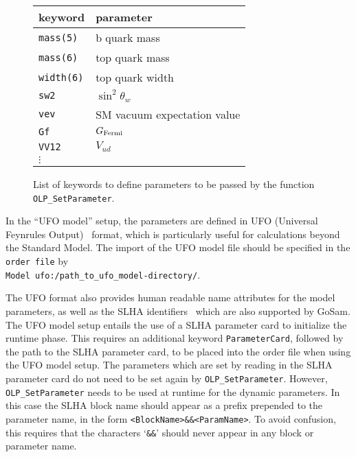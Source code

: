 \begin{figure}[htb]
\begin{tabular}{|l|l|}
\hline
keyword & parameter\\
\hline
{\tt mass(5)} & b quark mass \\
{\tt mass(6)} & top quark mass \\
{\tt width(6)} & top quark width\\
{\tt sw2}& $\sin^2\theta_w$\\
{\tt vev}& SM vacuum expectation value\\
{\tt Gf} & $G_{\rm{Fermi}}$\\
{\tt VV12}& $V_{ud}$\\
$\vdots$ & \\
\hline
\end{tabular}
\caption{List of keywords to define parameters to be passed by the function {\tt
OLP\_SetParameter}.}
\label{tab:keywords:static}
\end{figure}

In the ``UFO model'' setup, the parameters are defined in UFO (Universal Feynrules
Output)~\cite{Degrande:2011ua} format, which is particularly useful for
calculations beyond the Standard Model.
The import of the UFO model file should be specified in the {\tt order file} 
by \\{\tt Model ufo:/path\_to\_ufo\_model-directory/}.

The UFO format also provides human readable name attributes for the 
model parameters, as well as the 
SLHA identifiers~\cite{Skands:2003cj} which are also supported by GoSam.
The UFO model setup entails the use of a SLHA parameter card to initialize the runtime phase.
This requires an additional keyword {\tt ParameterCard}, followed by the path to the SLHA parameter card,
to be placed into the order file when using the UFO model setup. 
The parameters which are set by reading in the SLHA parameter card do not need to be set 
again by {\tt OLP\_SetParameter}. However, {\tt OLP\_SetParameter} needs to be used at 
runtime for the dynamic parameters. 
In this case the SLHA block name should appear as a prefix prepended to the parameter name, 
in the form  
{\tt <BlockName>\&\&<ParamName>}.
To avoid confusion, this requires that the characters `{\tt \&\&}' should never appear in 
any block or parameter name.

